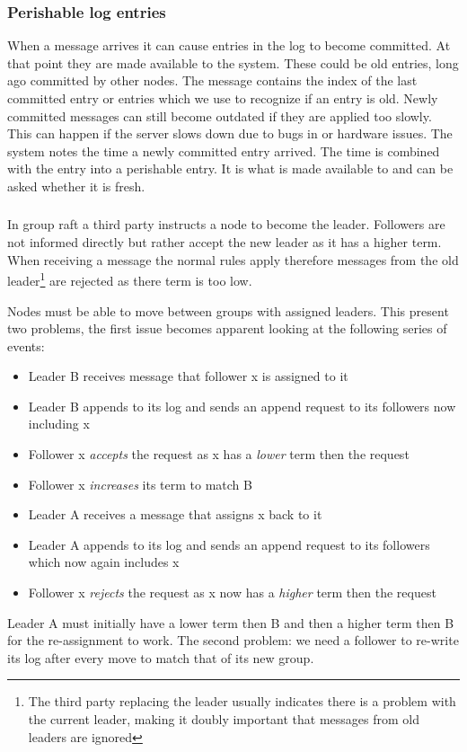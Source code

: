 \subsubsection*{Perishable log entries}
When a \raft{} message arrives it can cause entries in the log to become committed. At that point they are made available to the system. These could be old entries, long ago committed by other nodes. The message contains the index of the last committed entry or entries which we use to recognize if an entry is old. Newly committed messages can still become outdated if they are applied too slowly. This can happen if the server slows down due to bugs in \name{} or hardware issues. The system notes the time a newly committed entry arrived. The time is combined with the entry into a perishable entry. It is what is made available to \name{} and can be asked whether it is fresh.

\subsubsection*{\graft{}} \label{sec:dictraft}
In group raft a third party instructs a node to become the leader. Followers are not informed directly but rather accept the new leader as it has a higher term. When receiving a message the normal \raft{} rules apply therefore messages from the old leader\footnote{The third party replacing the leader usually indicates there is a problem with the current leader, making it doubly important that messages from old leaders are ignored} are rejected as there term is too low.

Nodes must be able to move between groups with assigned leaders. This present two problems, the first issue becomes apparent looking at the following series of events:
\begin{itemize}
	\item Leader B receives message that follower x is assigned to it
	\item Leader B appends to its log and sends an append request to its followers now including x
	\item Follower x \emph{accepts} the request as x has a \emph{lower} term then the request
	\item Follower x \emph{increases} its term to match B
	\item Leader A receives a message that assigns x back to it
	\item Leader A appends to its log and sends an append request to its followers which now again includes x
	\item Follower x \emph{rejects} the request as x now has a \emph{higher} term then the request
\end{itemize}
Leader A must initially have a lower term then B and then a higher term then B for the re-assignment to work. The second problem: we need a follower to re-write its log after every move to match that of its new group. 


